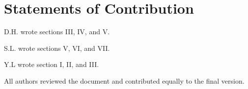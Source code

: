\documentclass[aps,prl,twocolumn, superscriptaddress,nobalancelastpage]{revtex4}
\begin{document}











\section{Statements of Contribution}
\noindent D.H. wrote sections III, IV, and V.

\noindent S.L. wrote sections V, VI, and VII.

\noindent Y.L wrote section I, II, and III.

\noindent All authors reviewed the document and contributed equally to the final version.
\vspace{-1em}
\end{document}

